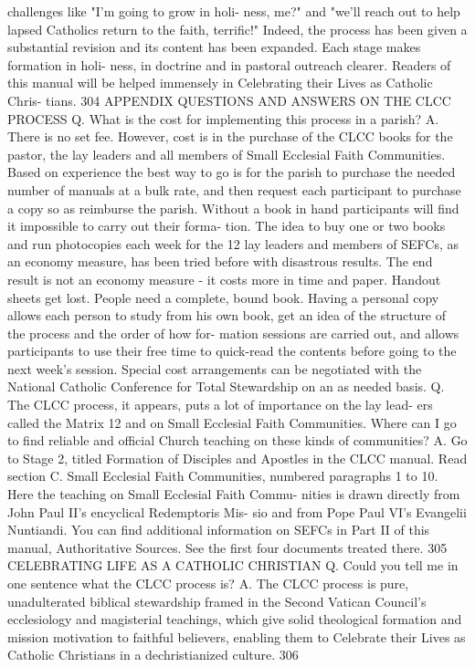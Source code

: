 \documentclass[oneside]{book}
\begin{document}
challenges like "I'm going to grow in holi- ness, me?" and "we'll reach out to
help lapsed Catholics return to the faith, terrific!" Indeed, the process has
been given a substantial revision and its content has been expanded. Each stage
makes formation in holi- ness, in doctrine and in pastoral outreach
clearer. Readers of this manual will be helped immensely in Celebrating their
Lives as Catholic Chris- tians.  304 APPENDIX QUESTIONS AND ANSWERS ON THE CLCC
PROCESS Q. What is the cost for implementing this process in a parish?  A. There
is no set fee. However, cost is in the purchase of the CLCC books for the
pastor, the lay leaders and all members of Small Ecclesial Faith
Communities. Based on experience the best way to go is for the parish to
purchase the needed number of manuals at a bulk rate, and then request each
participant to purchase a copy so as reimburse the parish. Without a book in
hand participants will find it impossible to carry out their forma- tion. The
idea to buy one or two books and run photocopies each week for the 12 lay
leaders and members of SEFCs, as an economy measure, has been tried before with
disastrous results. The end result is not an economy measure - it costs more in
time and paper. Handout sheets get lost. People need a complete, bound book.
Having a personal copy allows each person to study from his own book, get an
idea of the structure of the process and the order of how for- mation sessions
are carried out, and allows participants to use their free time to quick-read
the contents before going to the next week's session. Special cost arrangements
can be negotiated with the National Catholic Conference for Total Stewardship on
an as needed basis.  Q. The CLCC process, it appears, puts a lot of importance
on the lay lead- ers called the Matrix 12 and on Small Ecclesial Faith
Communities. Where can I go to find reliable and official Church teaching on
these kinds of communities?  A. Go to Stage 2, titled Formation of Disciples and
Apostles in the CLCC manual. Read section C. Small Ecclesial Faith Communities,
numbered paragraphs 1 to 10. Here the teaching on Small Ecclesial Faith Commu-
nities is drawn directly from John Paul II's encyclical Redemptoris Mis- sio and
from Pope Paul VI's Evangelii Nuntiandi. You can find additional information on
SEFCs in Part II of this manual, Authoritative Sources. See the first four
documents treated there.  305 CELEBRATING LIFE AS A CATHOLIC CHRISTIAN Q. Could
you tell me in one sentence what the CLCC process is?  A. The CLCC process is
pure, unadulterated biblical stewardship framed in the Second Vatican Council's
ecclesiology and magisterial teachings, which give solid theological formation
and mission motivation to faithful believers, enabling them to Celebrate their
Lives as Catholic Christians in a dechristianized culture.  306
\end{document}
